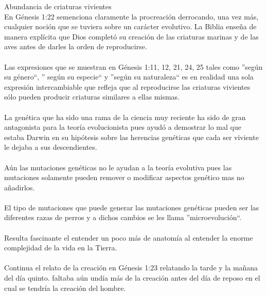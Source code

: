 \begin{section}{Abundancia de criaturas vivientes}
\\
En Génesis 1:22 semenciona claramente la procreación derrocando, una vez más, cualquier noción que se tuviera sobre un carácter  evolutivo. La Biblia enseña de manera explícita que Dios completó su creación de las criaturas marinas y de las aves antes de darles la orden de reproducirse.\\
\\
Las expresiones que se muestran en Génesis 1:11, 12, 21, 24, 25 tales como ''según su género``, '' según su especie`` y ''según su naturaleza`` es en realidad una sola expresión intercambiable que refleja que al reproducirse las criaturas vivientes sólo pueden producir criaturas similares a ellas mismas.\\
\\
La genética que ha sido una rama de la ciencia muy reciente ha sido de gran antagonista para la teoría evolucionista pues ayudó a demostrar lo mal que estaba Darwin en su hipótesis sobre las herencias genéticas que cada ser viviente le dejaba a sus descendientes.\\
\\
Aún las mutaciones genéticas no le ayudan a la teoría evolutiva pues las mutaciones solamente pueden remover o modificar aspectos genético mas no añadirlos.\\
\\
El tipo de mutaciones que puede generar las mutaciones genéticas pueden ser las diferentes razas de perros y a dichos cambios se les llama ''microevolución``.\\
\\
Resulta fascinante el entender un poco más de anatomía al entender la enorme complejidad de la vida en la Tierra.\\
\\
Continua el relato de la creación en Génesis 1:23 relatando la tarde y la mañana del día quinto. faltaba aún undía más de la creación antes del día de reposo en el cual se tendría la creación del hombre.

\end{section}
\newpage
